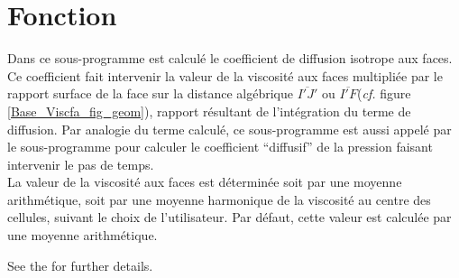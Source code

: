 
%
%
%
%


%

\hypertarget{viscfa}{}

\vspace{1cm}
\section*{Fonction}
Dans ce sous-programme est calcul\'e le coefficient de diffusion isotrope aux
faces. Ce coefficient fait intervenir la valeur de la viscosité aux faces
multipliée par le rapport surface de la face sur la distance alg\'ebrique
$\overline{I'J'}$ ou $\overline{I'F}$({\it cf.} figure
\ref{Base_Viscfa_fig_geom}), rapport résultant de l'intégration du terme de
diffusion.  Par analogie du terme calculé, ce sous-programme est aussi appelé
par le sous-programme  pour calculer le coefficient ``diffusif''
de la pression faisant intervenir le pas de temps.\\
La valeur de la viscosité aux faces est déterminée soit par une moyenne
arithmétique, soit par une moyenne harmonique de la viscosité au centre des
cellules, suivant le choix de l'utilisateur. Par défaut, cette valeur est
calculée par une moyenne arithmétique.

See the 
for further details.


